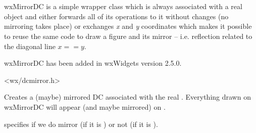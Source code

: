 
\section{}\label{wxmirrordc}

wxMirrorDC is a simple wrapper class which is always associated with a real 
 object and either forwards all of its operations to it
without changes (no mirroring takes place) or exchanges {\it x} and {\it y} 
coordinates which makes it possible to reuse the same code to draw a figure and
its mirror -- i.e. reflection related to the diagonal line $x == y$.

wxMirrorDC has been added in wxWidgets version 2.5.0.




<wx/dcmirror.h>



\label{wxmirrordcwxmirrordc}


Creates a (maybe) mirrored DC associated with the real . Everything
drawn on wxMirrorDC will appear (and maybe mirrored) on .

 specifies if we do mirror (if it is \true) or not (if it is 
\false).

